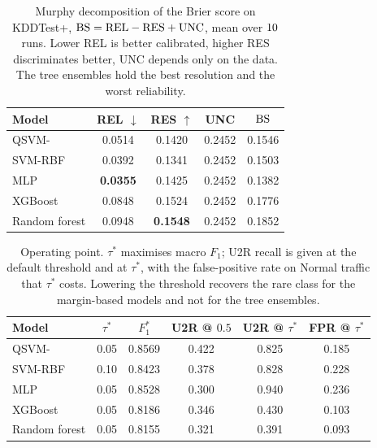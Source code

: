 \begin{table}[t]
\centering
\caption{Murphy decomposition of the Brier score on KDDTest+, $\mathrm{BS}=\mathrm{REL}-\mathrm{RES}+\mathrm{UNC}$, mean over $10$ runs. Lower REL is better calibrated, higher RES discriminates better, UNC depends only on the data. The tree ensembles hold the best resolution and the worst reliability.}
\label{tab:murphy}
\begin{tabular}{lcccc}
\toprule
Model & REL $\downarrow$ & RES $\uparrow$ & UNC & $\mathrm{BS}$ \\
\midrule
QSVM-\ZZ{} & 0.0514 & 0.1420 & 0.2452 & 0.1546 \\
SVM-RBF & 0.0392 & 0.1341 & 0.2452 & 0.1503 \\
MLP & \textbf{0.0355} & 0.1425 & 0.2452 & 0.1382 \\
XGBoost & 0.0848 & 0.1524 & 0.2452 & 0.1776 \\
Random forest & 0.0948 & \textbf{0.1548} & 0.2452 & 0.1852 \\
\bottomrule
\end{tabular}
\end{table}

\begin{table}[t]
\centering
\caption{Operating point. $\tau^{\ast}$ maximises macro $F_1$; U2R recall is given at the default threshold and at $\tau^{\ast}$, with the false-positive rate on Normal traffic that $\tau^{\ast}$ costs. Lowering the threshold recovers the rare class for the margin-based models and not for the tree ensembles.}
\label{tab:threshold}
\begin{tabular}{lccccc}
\toprule
Model & $\tau^{\ast}$ & $F_1^{\ast}$ & U2R @ $0.5$ & U2R @ $\tau^{\ast}$ & FPR @ $\tau^{\ast}$ \\
\midrule
QSVM-\ZZ{} & 0.05 & 0.8569 & 0.422 & 0.825 & 0.185 \\
SVM-RBF & 0.10 & 0.8423 & 0.378 & 0.828 & 0.228 \\
MLP & 0.05 & 0.8528 & 0.300 & 0.940 & 0.236 \\
XGBoost & 0.05 & 0.8186 & 0.346 & 0.430 & 0.103 \\
Random forest & 0.05 & 0.8155 & 0.321 & 0.391 & 0.093 \\
\bottomrule
\end{tabular}
\end{table}
